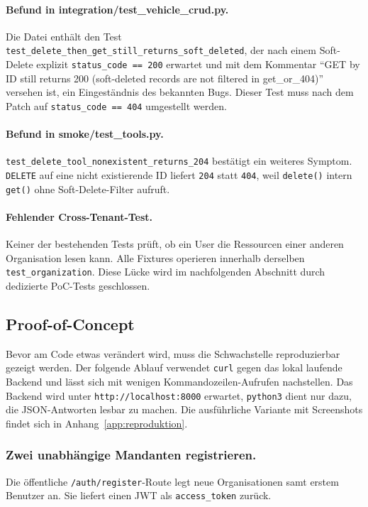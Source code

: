 \paragraph{Befund in integration/test\_vehicle\_crud.py.}
Die Datei enthält den Test
\texttt{test\_delete\_then\_get\_still\_returns\_soft\_deleted}, der nach
einem Soft-Delete explizit \texttt{status\_code == 200} erwartet und mit
dem Kommentar ``GET by ID still returns 200 (soft-deleted records are not
filtered in get\_or\_404)'' versehen ist, ein Eingeständnis des bekannten
Bugs. Dieser Test muss nach dem Patch auf \texttt{status\_code == 404}
umgestellt werden.

\paragraph{Befund in smoke/test\_tools.py.}
\texttt{test\_delete\_tool\_nonexistent\_returns\_204} bestätigt ein weiteres Symptom.
\texttt{DELETE} auf eine nicht existierende ID liefert \texttt{204} statt \texttt{404},
weil \texttt{delete()} intern \texttt{get()} ohne Soft-Delete-Filter aufruft.

\paragraph{Fehlender Cross-Tenant-Test.}
Keiner der bestehenden Tests prüft, ob ein User die Ressourcen einer anderen
Organisation lesen kann. Alle Fixtures operieren innerhalb derselben
\texttt{test\_organization}. Diese Lücke wird im nachfolgenden Abschnitt durch
dedizierte PoC-Tests geschlossen.

\subsection{Proof-of-Concept}
\label{sec:poc}

Bevor am Code etwas verändert wird, muss die Schwachstelle
reproduzierbar gezeigt werden. Der folgende Ablauf verwendet
\texttt{curl} gegen das lokal laufende Backend und lässt sich mit
wenigen Kommandozeilen-Aufrufen nachstellen. Das Backend wird unter
\texttt{http://localhost:8000} erwartet, \texttt{python3} dient nur
dazu, die JSON-Antworten lesbar zu machen. Die ausführliche Variante
mit Screenshots findet sich in Anhang~\ref{app:reproduktion}.

\subsubsection{Zwei unabhängige Mandanten registrieren.}
Die öffentliche \texttt{/auth/register}-Route legt neue Organisationen
samt erstem Benutzer an. Sie liefert einen JWT als
\texttt{access\_token} zurück.

